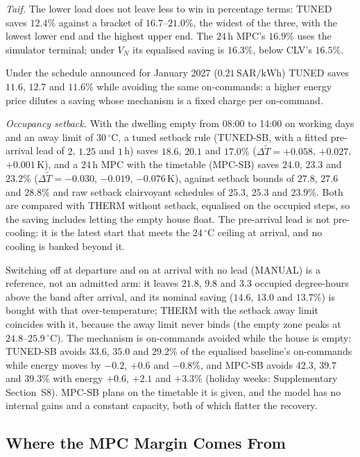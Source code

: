 \documentclass[pdflatex,sn-mathphys-num,iicol]{sn-jnl}
\theoremstyle{thmstyleone}\newtheorem{proposition}{Proposition}\newtheorem{corollary}{Corollary}
\theoremstyle{thmstyletwo}\newtheorem{remark}{Remark}\newtheorem{observation}{Observation}
\theoremstyle{thmstylethree}\newtheorem{definition}{Definition}
\newcommand{\SAR}{\text{SAR}}
\newcommand{\kWh}{\text{kWh}}
\begin{document}
\emph{Taif.} The lower load does not leave less to win in percentage terms: TUNED saves $12.4\%$ against a bracket of $16.7$--$21.0\%$, the widest of the three, with the lowest lower end and the highest upper end. The $24\,$h MPC's $16.9\%$ uses the simulator terminal; under $V_N$ its equalised saving is $16.3\%$, below CLV's $16.5\%$.

Under the schedule announced for January 2027 ($0.21\,\SAR/\kWh$) TUNED saves $11.6$, $12.7$ and $11.6\%$ while avoiding the same on-commands: a higher energy price dilutes a saving whose mechanism is a fixed charge per on-command.

\emph{Occupancy setback.} With the dwelling empty from 08:00 to 14:00 on working days and an away limit of $30\,^\circ$C, a tuned setback rule (TUNED-SB, with a fitted pre-arrival lead of $2$, $1.25$ and $1\,$h) saves $18.6$, $20.1$ and $17.0\%$ ($\Delta\tilde T=+0.058$, $+0.027$, $+0.001\,$K), and a $24\,$h MPC with the timetable (MPC-SB) saves $24.0$, $23.3$ and $23.2\%$ ($\Delta\tilde T=-0.030$, $-0.019$, $-0.076\,$K), against setback bounds of $27.8$, $27.6$ and $28.8\%$ and raw setback clairvoyant schedules of $25.3$, $25.3$ and $23.9\%$. Both are compared with THERM without setback, equalised on the occupied steps, so the saving includes letting the empty house float. The pre-arrival lead is not pre-cooling: it is the latest start that meets the $24\,^\circ$C ceiling at arrival, and no cooling is banked beyond it.

Switching off at departure and on at arrival with no lead (MANUAL) is a reference, not an admitted arm: it leaves $21.8$, $9.8$ and $3.3$ occupied degree-hours above the band after arrival, and its nominal saving ($14.6$, $13.0$ and $13.7\%$) is bought with that over-temperature; THERM with the setback away limit coincides with it, because the away limit never binds (the empty zone peaks at $24.8$--$25.9\,^\circ$C). The mechanism is on-commands avoided while the house is empty: TUNED-SB avoids $33.6$, $35.0$ and $29.2\%$ of the equalised baseline's on-commands while energy moves by $-0.2$, $+0.6$ and $-0.8\%$, and MPC-SB avoids $42.3$, $39.7$ and $39.3\%$ with energy $+0.6$, $+2.1$ and $+3.3\%$ (holiday weeks: Supplementary Section~S8). MPC-SB plans on the timetable it is given, and the model has no internal gains and a constant capacity, both of which flatter the recovery.


\subsection{Where the MPC Margin Comes From}
\label{subsec:ladder}
\end{document}
